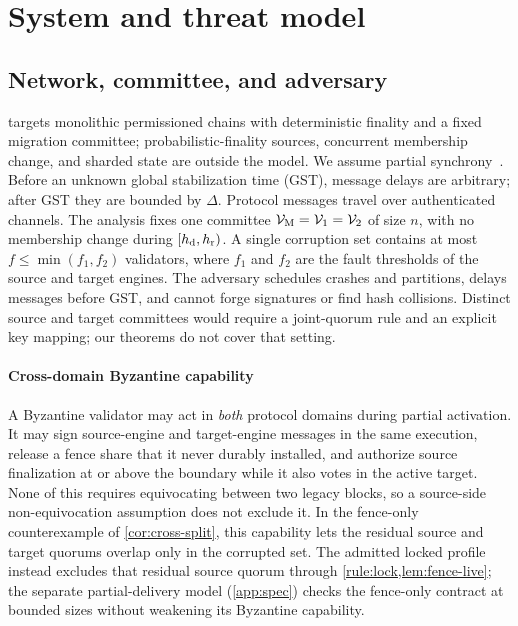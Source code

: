 \section{System and threat model}
\label{sec:model}

\subsection{Network, committee, and adversary}
\sage{} targets monolithic permissioned chains with deterministic finality and a fixed migration
committee; probabilistic-finality sources, concurrent membership change, and sharded state are outside
the model. We assume partial synchrony~\cite{dls}. Before an unknown global stabilization time (GST), message
delays are arbitrary; after GST they are bounded by $\Delta$. Protocol messages travel over
authenticated channels. The analysis fixes one committee
$\mathcal{V}_{\mathrm M}=\mathcal V_1=\mathcal V_2$ of size $n$, with no membership change during $[h_{\mathrm d},h_{\mathrm r})$. A single
corruption set contains at most $f\le\min(f_1,f_2)$ validators, where $f_1$ and $f_2$ are the fault
thresholds of the source and target engines. The adversary schedules crashes and partitions, delays
messages before GST, and cannot forge signatures or find hash collisions. Distinct source and target
committees would require a joint-quorum rule and an explicit key mapping; our theorems do not cover
that setting.

\paragraph{Cross-domain Byzantine capability}
A Byzantine validator may act in \emph{both} protocol domains during partial activation. It may sign
source-engine and target-engine messages in the same execution, release a fence share that it never
durably installed, and authorize source finalization at or above the boundary while it also votes in
the active target. None of this requires equivocating between two legacy blocks, so a source-side
non-equivocation assumption does not exclude it. In the fence-only counterexample of
\cref{cor:cross-split}, this capability lets the residual source and target quorums overlap only in
the corrupted set. The admitted locked profile instead excludes that residual source quorum through
\cref{rule:lock,lem:fence-live}; the separate partial-delivery model (\ref{app:spec}) checks the
fence-only contract at bounded sizes without weakening its Byzantine capability.

